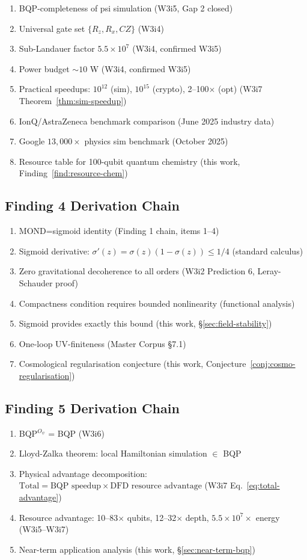 \documentclass[11pt]{article}
\theoremstyle{definition}
\theoremstyle{remark}
\newcommand{\ee}[1]{\times 10^{#1}}
\begin{document}
\begin{enumerate}[nosep]
\item BQP-completeness of psi simulation (W3i5, Gap 2 closed)
\item Universal gate set $\{R_z, R_x, CZ\}$ (W3i4)
\item Sub-Landauer factor $5.5\ee{7}$ (W3i4, confirmed W3i5)
\item Power budget $\sim 10$ W (W3i4, confirmed W3i5)
\item Practical speedups: $10^{12}$ (sim), $10^{15}$ (crypto),
  2--100$\times$ (opt) (W3i7 Theorem~\ref*{thm:sim-speedup})
\item IonQ/AstraZeneca benchmark comparison (June 2025 industry data)
\item Google $13{,}000\times$ physics sim benchmark (October 2025)
\item Resource table for 100-qubit quantum chemistry (this work,
  Finding~\ref{find:resource-chem})
\end{enumerate}

\subsection{Finding 4 Derivation Chain}

\begin{enumerate}[nosep]
\item MOND=sigmoid identity (Finding 1 chain, items 1--4)
\item Sigmoid derivative: $\sigma'(z) = \sigma(z)(1-\sigma(z)) \leq 1/4$
  (standard calculus)
\item Zero gravitational decoherence to all orders (W3i2 Prediction 6,
  Leray-Schauder proof)
\item Compactness condition requires bounded nonlinearity
  (functional analysis)
\item Sigmoid provides exactly this bound (this work,
  \S\ref{sec:field-stability})
\item One-loop UV-finiteness (Master Corpus \S7.1)
\item Cosmological regularisation conjecture (this work,
  Conjecture~\ref{conj:cosmo-regularisation})
\end{enumerate}

\subsection{Finding 5 Derivation Chain}

\begin{enumerate}[nosep]
\item BQP$^{O_\psi}$ = BQP (W3i6)
\item Lloyd-Zalka theorem: local Hamiltonian simulation $\in$ BQP
\item Physical advantage decomposition:
  $\text{Total} = \text{BQP speedup} \times \text{DFD resource advantage}$
  (W3i7 Eq.~\ref*{eq:total-advantage})
\item Resource advantage: 10--83$\times$ qubits, 12--32$\times$ depth,
  $5.5\ee{7}\times$ energy (W3i5--W3i7)
\item Near-term application analysis (this work, \S\ref{sec:near-term-bqp})
\end{enumerate}
\end{document}
